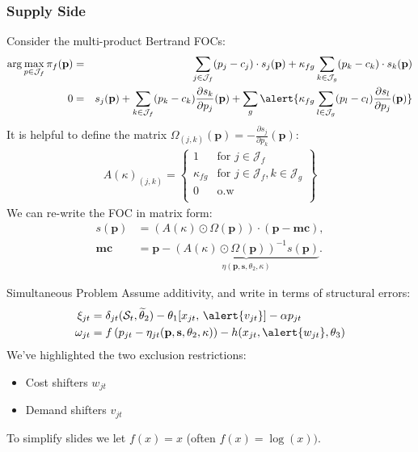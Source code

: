\documentclass[xcolor=pdftex,dvipsnames,table,mathserif,aspectratio=169]{beamer}
\begin{document}
\begin{frame}[plain]
\frametitle{Supply Side}
Consider the multi-product Bertrand FOCs:
\footnotesize
{\begin{eqnarray*}
\arg \max_{p \in \mathcal{J}_f} \pi_f (\mathbf{p}) &=& \sum_{j \in \mathcal{J}_f} (p_j - c_j) \cdot s_j(\mathbf{p}) +  \kappa_{fg}\sum_{k \in \mathcal{J}_g} (p_k - c_k) \cdot s_k(\mathbf{p}) \\
0&=& s_j(\mathbf{p}) + \sum_{k \in \mathcal{J}_f} (p_k - c_k) \frac{\partial s_{k}}{\partial p_j}(\mathbf{p}) + \sum_g  \alert{\kappa_{fg} \sum_{l \in \mathcal{J}_g} (p_l - c_l) \frac{\partial s_{l}}{\partial p_j}(\mathbf{p})}\\
\end{eqnarray*}
}
It is helpful to define the matrix $\Omega_{(j,k)}(\mathbf{p})  = - \frac{\partial s_{j}}{\partial p_k}(\mathbf{p})$:
\begin{eqnarray*}
A(\kappa)_{(j,k)} = \left\{\begin{array}{lr}
          1 & \text{for }  j \in \mathcal{J}_f \\ 
       	  \kappa_{fg} & \text{for }  j \in \mathcal{J}_f, k \in \mathcal{J}_g\\
	  0 & \text{o.w}\\
        \end{array} \right\}
\end{eqnarray*}
We can re-write the FOC in matrix form:
\begin{eqnarray*}
        s(\mathbf{p}) &= (A(\kappa) \odot \Omega(\mathbf{p})) \cdot (\mathbf{p} - \mathbf{mc}), \\
       \mathbf{mc} &=  \mathbf{p} - \underbrace{(A(\kappa) \odot \Omega(\mathbf{p}))^{-1} s(\mathbf{p})}_{\eta(\mathbf{p},\mathbf{s},\theta_2,\kappa)}.
\end{eqnarray*}
\end{frame}

\begin{frame}{Simultaneous Problem}
Assume additivity, and write in terms of structural errors:
\begin{align*}
\xi_{jt} &=\delta_{jt}(\mathcal{S}_t,\widetilde{\theta}_2) - \theta_1[x_{jt}, \, \alert{v_{jt}}] - \alpha p_{jt} \\
\omega_{jt} &= f \left( p_{jt} - \eta_{jt}(\mathbf{p},\mathbf{s},\theta_2,\kappa) \right) - h(x_{jt}, \alert{w_{jt}},\theta_3)
\end{align*}
We've highlighted the two \alert{exclusion restrictions}:
\begin{itemize}
\item Cost shifters $w_{jt}$
\item Demand shifters $v_{jt}$
\end{itemize}
To simplify slides we let $f(x)=x$ (often $f(x) =\log(x))$.
\end{frame}
\end{document}
